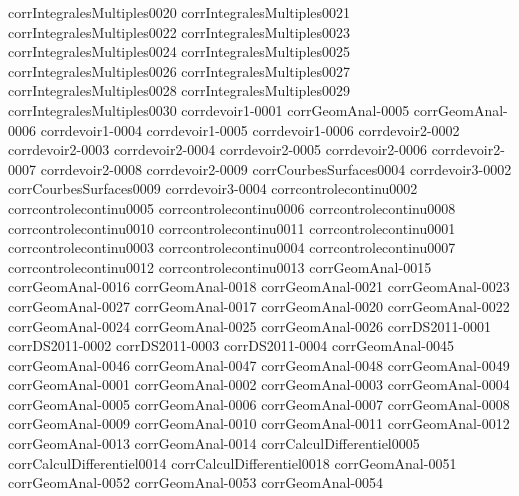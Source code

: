 {corrIntegralesMultiples0020}
{corrIntegralesMultiples0021}
{corrIntegralesMultiples0022}
{corrIntegralesMultiples0023}
{corrIntegralesMultiples0024}
{corrIntegralesMultiples0025}
{corrIntegralesMultiples0026}
{corrIntegralesMultiples0027}
{corrIntegralesMultiples0028}
{corrIntegralesMultiples0029}
{corrIntegralesMultiples0030}
{corrdevoir1-0001}
{corrGeomAnal-0005}
{corrGeomAnal-0006}
{corrdevoir1-0004}
{corrdevoir1-0005}
{corrdevoir1-0006}
{corrdevoir2-0002}
{corrdevoir2-0003}
{corrdevoir2-0004}
{corrdevoir2-0005}
{corrdevoir2-0006}
{corrdevoir2-0007}
{corrdevoir2-0008}
{corrdevoir2-0009}
{corrCourbesSurfaces0004}
{corrdevoir3-0002}
{corrCourbesSurfaces0009}
{corrdevoir3-0004}
{corrcontrolecontinu0002}
{corrcontrolecontinu0005}
{corrcontrolecontinu0006}
{corrcontrolecontinu0008}
{corrcontrolecontinu0010}
{corrcontrolecontinu0011}
{corrcontrolecontinu0001}
{corrcontrolecontinu0003}
{corrcontrolecontinu0004}
{corrcontrolecontinu0007}
{corrcontrolecontinu0012}
{corrcontrolecontinu0013}
{corrGeomAnal-0015}
{corrGeomAnal-0016}
{corrGeomAnal-0018}
{corrGeomAnal-0021}
{corrGeomAnal-0023}
{corrGeomAnal-0027}
{corrGeomAnal-0017}
{corrGeomAnal-0020}
{corrGeomAnal-0022}
{corrGeomAnal-0024}
{corrGeomAnal-0025}
{corrGeomAnal-0026}
{corrDS2011-0001}
{corrDS2011-0002}
{corrDS2011-0003}
{corrDS2011-0004}
{corrGeomAnal-0045}
{corrGeomAnal-0046}
{corrGeomAnal-0047}
{corrGeomAnal-0048}
{corrGeomAnal-0049}
{corrGeomAnal-0001}
{corrGeomAnal-0002}
{corrGeomAnal-0003}
{corrGeomAnal-0004}
{corrGeomAnal-0005}
{corrGeomAnal-0006}
{corrGeomAnal-0007}
{corrGeomAnal-0008}
{corrGeomAnal-0009}
{corrGeomAnal-0010}
{corrGeomAnal-0011}
{corrGeomAnal-0012}
{corrGeomAnal-0013}
{corrGeomAnal-0014}
{corrCalculDifferentiel0005}
{corrCalculDifferentiel0014}
{corrCalculDifferentiel0018}
{corrGeomAnal-0051}
{corrGeomAnal-0052}
{corrGeomAnal-0053}
{corrGeomAnal-0054}
